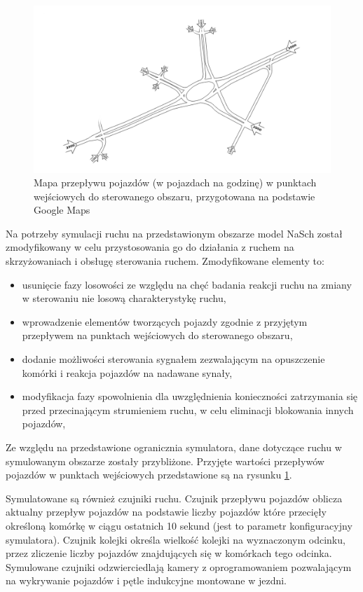 \begin{figure}[h]
    \centering
    \includegraphics[width=1.0\textwidth]{images/mapa_ruch.png}
    \caption{Mapa przepływu pojazdów (w pojazdach na godzinę) w punktach wejściowych do sterowanego obszaru, przygotowana na podstawie Google Maps \cite{google_maps}}
    \label{fig:mapa_ruch}
\end{figure}

Na potrzeby symulacji ruchu na przedstawionym obszarze model NaSch został zmodyfikowany w celu przystosowania go do działania z ruchem na skrzyżowaniach i obsługę sterowania ruchem. Zmodyfikowane elementy to:
\begin{itemize}
	\item usunięcie fazy losowości ze względu na chęć badania reakcji ruchu na zmiany w sterowaniu nie losową charakterystykę ruchu,
	\item wprowadzenie elementów tworzących pojazdy zgodnie z przyjętym przepływem na punktach wejściowych do sterowanego obszaru,
	\item dodanie możliwości sterowania sygnałem zezwalającym na opuszczenie komórki i reakcja pojazdów na nadawane synały,
	\item modyfikacja fazy spowolnienia dla uwzględnienia konieczności zatrzymania się przed przecinającym strumieniem ruchu, w celu eliminacji blokowania innych pojazdów,
\end{itemize}

Ze względu na przedstawione ogranicznia symulatora, dane dotyczące ruchu w symulowanym obszarze zostały przybliżone. Przyjęte wartości przepływów pojazdów w punktach wejściowych przedstawione są na rysunku \ref{fig:mapa_ruch}.

Symulatowane są również czujniki ruchu. Czujnik przepływu pojazdów oblicza aktualny przepływ pojazdów na podstawie liczby pojazdów które przecięły określoną komórkę w ciągu ostatnich 10 sekund (jest to parametr konfiguracyjny symulatora). Czujnik kolejki określa wielkość kolejki na wyznaczonym odcinku, przez zliczenie liczby pojazdów znajdujących się w komórkach tego odcinka. Symulowane czujniki odzwierciedlają kamery z oprogramowaniem pozwalającym na wykrywanie pojazdów i pętle indukcyjne montowane w jezdni.

